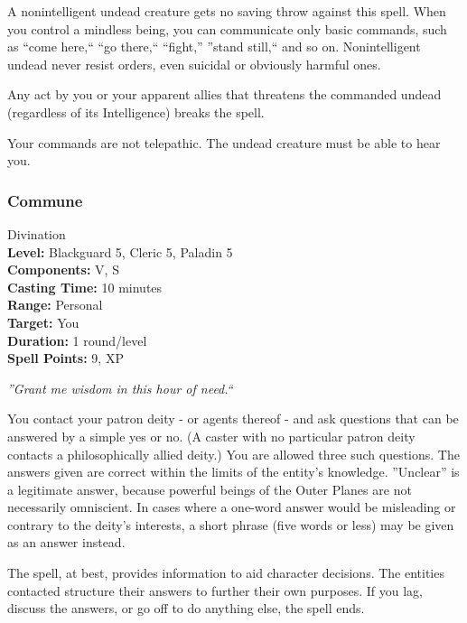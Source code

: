 A nonintelligent undead creature gets no saving throw against this spell. 
When you control a mindless being, you can communicate only basic commands, such as ``come here,`` ``go there,`` ``fight,'' ''stand still,`` and so on. 
Nonintelligent undead never resist orders, even suicidal or obviously harmful ones.

Any act by you or your apparent allies that threatens the commanded undead (regardless of its Intelligence) breaks the spell.

Your commands are not telepathic. The undead creature must be able to hear you.

\subsubsection{Commune}
\label{Spell:Commune}
Divination
\\ \textbf{Level:} Blackguard 5, Cleric 5, Paladin 5
\\ \textbf{Components:} V, S
\\ \textbf{Casting Time:} 10 minutes
\\ \textbf{Range:} Personal
\\ \textbf{Target:} You
\\ \textbf{Duration:} 1 round/level
\\ \textbf{Spell Points:} 9, XP

\emph{''Grant me wisdom in this hour of need.``}

You contact your patron deity - or agents thereof - and ask questions that can be answered by a simple yes or no. 
(A caster with no particular patron deity contacts a philosophically allied deity.) 
You are allowed three such questions. 
The answers given are correct within the limits of the entity's knowledge. 
''Unclear'' is a legitimate answer, because powerful beings of the Outer Planes are not necessarily omniscient. 
In cases where a one-word answer would be misleading or contrary to the deity's interests, 
a short phrase (five words or less) may be given as an answer instead.

The spell, at best, provides information to aid character decisions. 
The entities contacted structure their answers to further their own purposes. 
If you lag, discuss the answers, or go off to do anything else, the spell ends.

